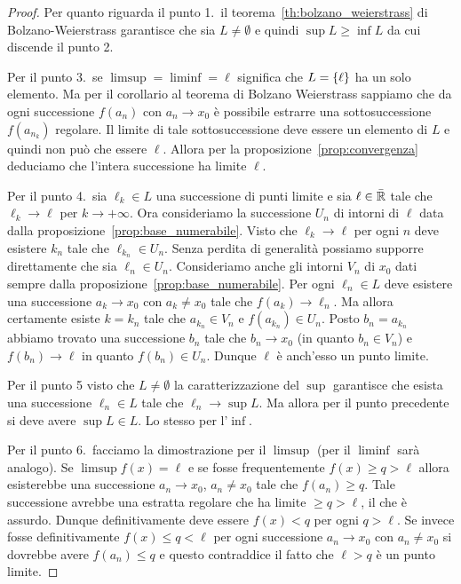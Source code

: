 %
\begin{proof}
  Per quanto riguarda il punto 1.\
  il teorema~\ref{th:bolzano_weierstrass} di Bolzano-Weierstrass
  garantisce che sia $L\neq \emptyset$ e
  quindi $\sup L \ge \inf L$ da cui discende il punto 2.

  Per il punto 3.\ se $\limsup = \liminf = \ell$ significa che $L={\left\{ \ell \right\}}$
  ha un solo elemento. Ma per il corollario al teorema di Bolzano Weierstrass
  sappiamo che da ogni successione $f(a_n)$ con $a_n\to x_0$ 
  è possibile estrarre una sottosuccessione $f(a_{n_k})$ regolare. 
  Il limite di tale sottosuccessione deve essere un elemento di $L$
  e quindi non può che essere $\ell$. 
  Allora per la proposizione~\ref{prop:convergenza}
  deduciamo che l'intera successione ha limite $\ell$.

  Per il punto 4.\ sia $\ell_k\in L$ una successione di punti limite
  e sia $\ell\in \bar {\mathbb R}$ tale che $\ell_k \to \ell$ per $k\to +\infty$.
  Ora consideriamo la successione $U_n$ di intorni di $\ell$ 
  data dalla proposizione~\ref{prop:base_numerabile}.
  Visto che $\ell_k\to \ell$ per ogni $n$ deve esistere $k_n$ tale 
  che $\ell_{k_n}\in U_n$. Senza perdita di generalità possiamo 
  supporre direttamente che sia $\ell_n\in U_n$.
  Consideriamo anche gli intorni $V_n$ di $x_0$ dati sempre 
  dalla proposizione~\ref{prop:base_numerabile}.
  Per ogni $\ell_n \in L$ deve esistere una successione $a_k\to x_0$ 
  con $a_k\neq x_0$ tale che $f(a_k)\to \ell_n$.
  Ma allora certamente esiste $k=k_n$ tale che $a_{k_n}\in V_n$ 
  e $f(a_{k_n})\in U_n$. 
  Posto $b_n = a_{k_n}$ abbiamo trovato una successione $b_n$ 
  tale che $b_n\to x_0$ (in quanto $b_n\in V_n$) e $f(b_n)\to \ell$
  in quanto $f(b_n)\in U_n$. Dunque $\ell$ è anch'esso un punto limite. 

  Per il punto 5
  visto che $L\neq \emptyset$ la caratterizzazione del $\sup$
  garantisce che esista una successione $\ell_n\in L$ tale che $\ell_n \to \sup L$.
  Ma allora per il punto precedente si deve avere $\sup L \in L$.
  Lo stesso per l'$\inf$.

  Per il punto 6.\ facciamo la dimostrazione per il $\limsup$ (per il $\liminf$
  sarà analogo). Se $\limsup f(x) = \ell$ e se fosse frequentemente
  $f(x) \ge q > \ell$ allora esisterebbe una successione $a_n\to x_0$, 
  $a_n\neq x_0$ tale che $f(a_n)\ge q$.
  Tale successione avrebbe una estratta regolare
  che ha limite $\ge q> \ell$, il che è assurdo.
  Dunque definitivamente deve essere $f(x) < q$ per ogni $q>\ell$.
  Se invece fosse definitivamente $f(x) \le q < \ell$ per ogni
  successione $a_n\to x_0$ con $a_n\neq x_0$ si dovrebbe avere 
  $f(a_n) \le q$ e questo contraddice il fatto che $\ell>q$ 
  è un punto limite.


\end{proof}
